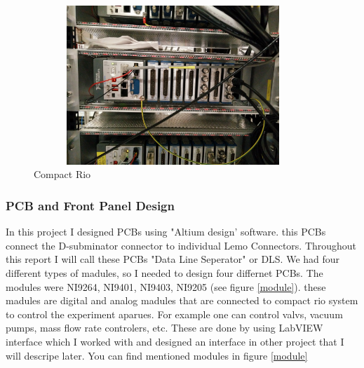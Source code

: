 \documentclass[12pt,a4paper]{article}
\begin{document}
\begin{figure}[h]
\centering
\includegraphics[width=105mm, height=60mm]{crio}
\caption{Compact Rio}
\label{crio}
\end{figure}

\subsubsection{PCB and Front Panel Design}
In this project I designed PCBs using "Altium design' software. this PCBs connect the D-subminator connector to individual Lemo Connectors. Throughout this report I will call these PCBs "Data Line Seperator" or DLS. We had four different types of madules, so I needed to design four differnet PCBs.
The modules were NI9264, NI9401, NI9403, NI9205 (see figure \ref{module}). these madules are digital and analog madules that are connected to compact rio system to control the experiment aparues. For example one can control valvs, vacuum pumps, mass flow rate controlers, etc. These are done by using LabVIEW interface which I worked with and designed an interface in other project that  I will descripe later. You can find mentioned modules in figure \ref{module}
\end{document}
